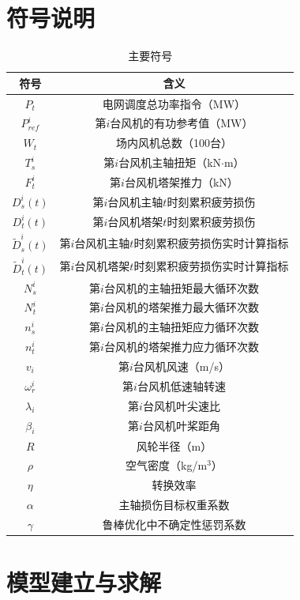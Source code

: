 \documentclass[bwprint]{gmcmthesis}
\numberwithin{figure}{section}
\begin{document}
\section{符号说明}
\begin{table}[h]
	\centering
	\caption{主要符号}
	\label{tab:symbols}
	\begin{tabular}{cc}
		\toprule
		\textbf{符号} & \textbf{含义} \\
		\midrule
		$P_t$ & 电网调度总功率指令（MW） \\
		$P_{ref}^i$ & 第$i$台风机的有功参考值（MW） \\
		$W_t$ & 场内风机总数（100台） \\
		$T_s^i$ & 第$i$台风机主轴扭矩（kN$\cdot$m） \\
		$F_t^i$ & 第$i$台风机塔架推力（kN） \\
		$D_s^i(t)$ & 第$i$台风机主轴$t$时刻累积疲劳损伤 \\
		$D_t^i(t)$ & 第$i$台风机塔架$t$时刻累积疲劳损伤 \\
		$\tilde{D}_s^i(t)$ & 第$i$台风机主轴$t$时刻累积疲劳损伤实时计算指标 \\
		$\tilde{D}_t^i(t)$ & 第$i$台风机塔架$t$时刻累积疲劳损伤实时计算指标 \\
		$N_s^i$ & 第$i$台风机的主轴扭矩最大循环次数 \\
		$N_t^i$ & 第$i$台风机的塔架推力最大循环次数 \\
		$n_s^i$ & 第$i$台风机的主轴扭矩应力循环次数 \\
		$n_t^i$ & 第$i$台风机的塔架推力应力循环次数 \\
		$v_i$ & 第$i$台风机风速（m/s） \\
		$\omega_r^i$& 第$i$台风机低速轴转速\\
		$\lambda_i$ &  第$i$台风机叶尖速比 \\
		$\beta_{i}$& 第$i$台风机叶桨距角\\
		$R$ & 风轮半径（m） \\
		$\rho$ & 空气密度（kg/m$^3$） \\
		$\eta$ & 转换效率\\
		$\alpha$ & 主轴损伤目标权重系数 \\
		$\gamma$ & 鲁棒优化中不确定性惩罚系数 \\
		\bottomrule
	\end{tabular}
\end{table}
\newpage
\section{模型建立与求解}
\end{document}

